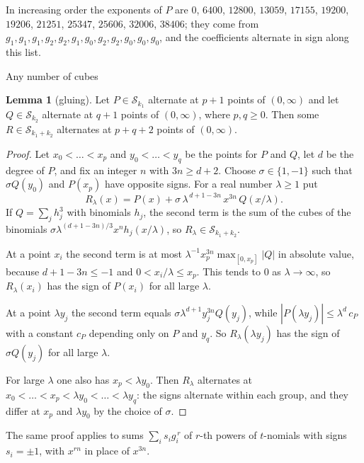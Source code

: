 \documentclass[10pt,a4paper]{article}
\makeatletter
\renewcommand\section{\@startsection{section}{1}{\z@}{1.7em plus .3em minus .2em}{0.25em}%
  {\normalfont\bfseries\fontsize{13.5}{17}\selectfont\raggedright}}
\theoremstyle{definition}
\newtheorem{lemma}[theorem]{Lemma}
\makeatother
\begin{document}
In increasing order the exponents of $P$ are $0$, $6400$, $12800$, $13059$, $17155$, $19200$, $19206$, $21251$,
$25347$, $25606$, $32006$, $38406$; they come from $g_1,g_1,g_1,g_2,g_2,g_1,g_0,g_2,g_2,g_0,g_0,g_0$, and the
coefficients alternate in sign along this list.

\section{Any number of cubes}\label{sec:more}

\begin{lemma}[gluing]\label{lem:glue}
Let $P\in\mathcal{S}_{k_1}$ alternate at $p+1$ points of $(0,\infty)$ and let $Q\in\mathcal{S}_{k_2}$ alternate at
$q+1$ points of $(0,\infty)$, where $p,q\ge0$. Then some $R\in\mathcal{S}_{k_1+k_2}$ alternates at $p+q+2$ points
of $(0,\infty)$.
\end{lemma}
\begin{proof}
Let $x_0<\dots<x_p$ and $y_0<\dots<y_q$ be the points for $P$ and $Q$, let $d$ be the degree of $P$, and fix an
integer $n$ with $3n\ge d+2$. Choose $\sigma\in\{1,-1\}$ such that $\sigma Q(y_0)$ and $P(x_p)$ have opposite
signs. For a real number $\lambda\ge1$ put
\[
R_\lambda(x)=P(x)+\sigma\,\lambda^{\,d+1-3n}\,x^{3n}\,Q(x/\lambda).
\]
If $Q=\sum_j h_j^3$ with binomials $h_j$, the second term is the sum of the cubes of the binomials
$\sigma\lambda^{(d+1-3n)/3}x^{n}h_j(x/\lambda)$, so $R_\lambda\in\mathcal{S}_{k_1+k_2}$.

At a point $x_i$ the second term is at most $\lambda^{-1}x_p^{3n}\max_{[0,x_p]}|Q|$ in absolute value, because
$d+1-3n\le-1$ and $0<x_i/\lambda\le x_p$. This tends to $0$ as $\lambda\to\infty$, so $R_\lambda(x_i)$ has the sign
of $P(x_i)$ for all large $\lambda$.

At a point $\lambda y_j$ the second term equals $\sigma\lambda^{d+1}y_j^{3n}Q(y_j)$, while
$|P(\lambda y_j)|\le\lambda^{d}\,c_P$ with a constant $c_P$ depending only on $P$ and $y_q$. So
$R_\lambda(\lambda y_j)$ has the sign of $\sigma Q(y_j)$ for all large $\lambda$.

For large $\lambda$ one also has $x_p<\lambda y_0$. Then $R_\lambda$ alternates at
$x_0<\dots<x_p<\lambda y_0<\dots<\lambda y_q$: the signs alternate within each group, and they differ at $x_p$ and
$\lambda y_0$ by the choice of $\sigma$.
\end{proof}

The same proof applies to sums $\sum_i s_ig_i^{\,r}$ of $r$-th powers of $t$-nomials with signs $s_i=\pm1$, with
$x^{rn}$ in place of $x^{3n}$.
\end{document}
